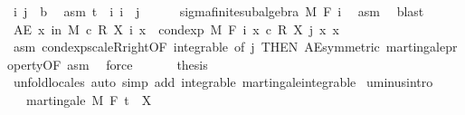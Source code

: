 \begin{isabellebody}
\ i\ j\ {\isacharcolon}{\kern0pt}{\isacharcolon}{\kern0pt}\ {\isacharprime}{\kern0pt}b\ \isamarkupfalse%
\ asm{\isacharcolon}{\kern0pt}\ {\isachardoublequoteopen}t\ {\isasymle}\ i{\isachardoublequoteclose}\ {\isachardoublequoteopen}i\ {\isasymle}\ j{\isachardoublequoteclose}\isanewline
\ \ \ \ \isamarkupfalse%
\ sigma{\isacharunderscore}{\kern0pt}finite{\isacharunderscore}{\kern0pt}subalgebra\ M\ {\isachardoublequoteopen}F\ i{\isachardoublequoteclose}\ \isamarkupfalse%
\ asm\ \isamarkupfalse%
\ blast\isanewline
\ \ \ \ \isamarkupfalse%
\ {\isachardoublequoteopen}AE\ x\ in\ M{\isachardot}{\kern0pt}\ c\ {\isacharasterisk}{\kern0pt}\isactrlsub R\ X\ i\ x\ {\isacharequal}{\kern0pt}\ cond{\isacharunderscore}{\kern0pt}exp\ M\ {\isacharparenleft}{\kern0pt}F\ i{\isacharparenright}{\kern0pt}\ {\isacharparenleft}{\kern0pt}{\isasymlambda}x{\isachardot}{\kern0pt}\ c\ {\isacharasterisk}{\kern0pt}\isactrlsub R\ X\ j\ x{\isacharparenright}{\kern0pt}\ x{\isachardoublequoteclose}\ \isamarkupfalse%
\ asm\ cond{\isacharunderscore}{\kern0pt}exp{\isacharunderscore}{\kern0pt}scaleR{\isacharunderscore}{\kern0pt}right{\isacharbrackleft}{\kern0pt}OF\ integrable{\isacharcomma}{\kern0pt}\ of\ j{\isacharcomma}{\kern0pt}\ THEN\ AE{\isacharunderscore}{\kern0pt}symmetric{\isacharbrackright}{\kern0pt}\ martingale{\isacharunderscore}{\kern0pt}property{\isacharbrackleft}{\kern0pt}OF\ asm{\isacharbrackright}{\kern0pt}\ \isamarkupfalse%
\ force\isanewline
\ \ \isacommand{{\isacharbraceright}{\kern0pt}}\isamarkupfalse%
\isanewline
\ \ \isamarkupfalse%
\ {\isacharquery}{\kern0pt}thesis\ \isamarkupfalse%
\ {\isacharparenleft}{\kern0pt}unfold{\isacharunderscore}{\kern0pt}locales{\isacharparenright}{\kern0pt}\ {\isacharparenleft}{\kern0pt}auto\ simp\ add{\isacharcolon}{\kern0pt}\ integrable\ martingale{\isachardot}{\kern0pt}integrable{\isacharparenright}{\kern0pt}\isanewline
{}\isamarkupfalse%
%
\endisatagproof
{\isafoldproof}%
%
\isadelimproof
\isanewline
%
\endisadelimproof
\isanewline
{}\isamarkupfalse%
\ uminus{\isacharbrackleft}{\kern0pt}intro{\isacharbrackright}{\kern0pt}{\isacharcolon}{\kern0pt}\isanewline
\ \ \ {\isachardoublequoteopen}martingale\ M\ F\ t\ {\isacharparenleft}{\kern0pt}{\isacharminus}{\kern0pt}\ X{\isacharparenright}{\kern0pt}{\isachardoublequoteclose}\ \isanewline
%
\isadelimproof
\ \ %
\endisadelimproof
%
\isatagproof

\end{isabellebody}
